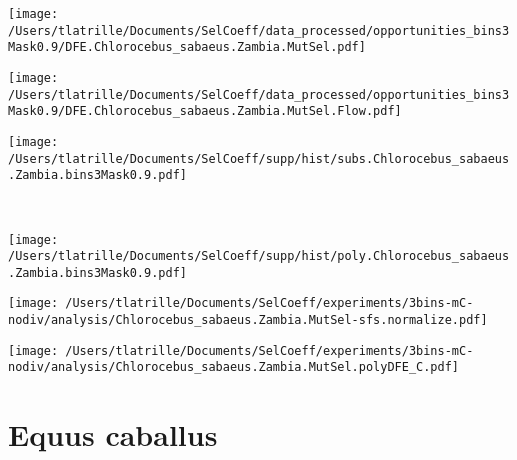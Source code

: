 \documentclass{article}
\begin{document}
    \begin{minipage}{0.32\linewidth}
        \texttt{[image: /Users/tlatrille/Documents/SelCoeff/data\_processed/opportunities\_bins3Mask0.9/DFE.Chlorocebus\_sabaeus.Zambia.MutSel.pdf]}
    \end{minipage}
    \begin{minipage}{0.32\linewidth}
        \texttt{[image: /Users/tlatrille/Documents/SelCoeff/data\_processed/opportunities\_bins3Mask0.9/DFE.Chlorocebus\_sabaeus.Zambia.MutSel.Flow.pdf]}
    \end{minipage}
    \begin{minipage}{0.32\linewidth}
        \texttt{[image: /Users/tlatrille/Documents/SelCoeff/supp/hist/subs.Chlorocebus\_sabaeus.Zambia.bins3Mask0.9.pdf]}
    \end{minipage}
    \\
    \begin{minipage}{0.32\linewidth}
        \texttt{[image: /Users/tlatrille/Documents/SelCoeff/supp/hist/poly.Chlorocebus\_sabaeus.Zambia.bins3Mask0.9.pdf]}
    \end{minipage}
    \begin{minipage}{0.32\linewidth}
        \texttt{[image: /Users/tlatrille/Documents/SelCoeff/experiments/3bins-mC-nodiv/analysis/Chlorocebus\_sabaeus.Zambia.MutSel-sfs.normalize.pdf]}
    \end{minipage}
    \begin{minipage}{0.32\linewidth}
        \texttt{[image: /Users/tlatrille/Documents/SelCoeff/experiments/3bins-mC-nodiv/analysis/Chlorocebus\_sabaeus.Zambia.MutSel.polyDFE\_C.pdf]}
    \end{minipage}
    \section{Equus caballus}
\end{document}
